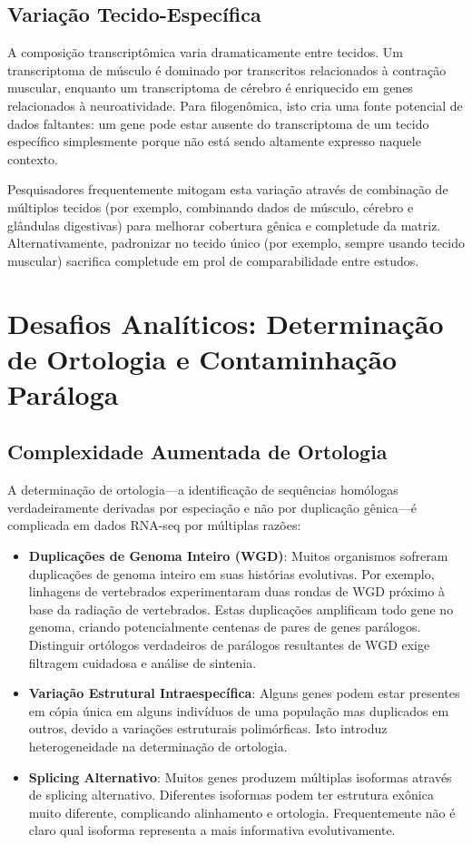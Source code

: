 \subsection{Variação Tecido-Específica}

A composição transcriptômica varia dramaticamente entre tecidos. Um transcriptoma de músculo é dominado por transcritos relacionados à contração muscular, enquanto um transcriptoma de cérebro é enriquecido em genes relacionados à neuroatividade. Para filogenômica, isto cria uma fonte potencial de dados faltantes: um gene pode estar ausente do transcriptoma de um tecido específico simplesmente porque não está sendo altamente expresso naquele contexto.

Pesquisadores frequentemente mitogam esta variação através de combinação de múltiplos tecidos (por exemplo, combinando dados de músculo, cérebro e glândulas digestivas) para melhorar cobertura gênica e completude da matriz. Alternativamente, padronizar no tecido único (por exemplo, sempre usando tecido muscular) sacrifica completude em prol de comparabilidade entre estudos.

\section{Desafios Analíticos: Determinação de Ortologia e Contaminhação Paráloga}

\subsection{Complexidade Aumentada de Ortologia}

A determinação de ortologia---a identificação de sequências homólogas verdadeiramente derivadas por especiação e não por duplicação gênica---é complicada em dados RNA-seq por múltiplas razões:

\begin{itemize}
\item \textbf{Duplicações de Genoma Inteiro (WGD)}: Muitos organismos sofreram duplicações de genoma inteiro em suas histórias evolutivas. Por exemplo, linhagens de vertebrados experimentaram duas rondas de WGD próximo à base da radiação de vertebrados. Estas duplicações amplificam todo gene no genoma, criando potencialmente centenas de pares de genes parálogos. Distinguir ortólogos verdadeiros de parálogos resultantes de WGD exige filtragem cuidadosa e análise de sintenia.

\item \textbf{Variação Estrutural Intraespecífica}: Alguns genes podem estar presentes em cópia única em alguns indivíduos de uma população mas duplicados em outros, devido a variações estruturais polimórficas. Isto introduz heterogeneidade na determinação de ortologia.

\item \textbf{Splicing Alternativo}: Muitos genes produzem múltiplas isoformas através de splicing alternativo. Diferentes isoformas podem ter estrutura exônica muito diferente, complicando alinhamento e ortologia. Frequentemente não é claro qual isoforma representa a mais informativa evolutivamente.
\end{itemize}

